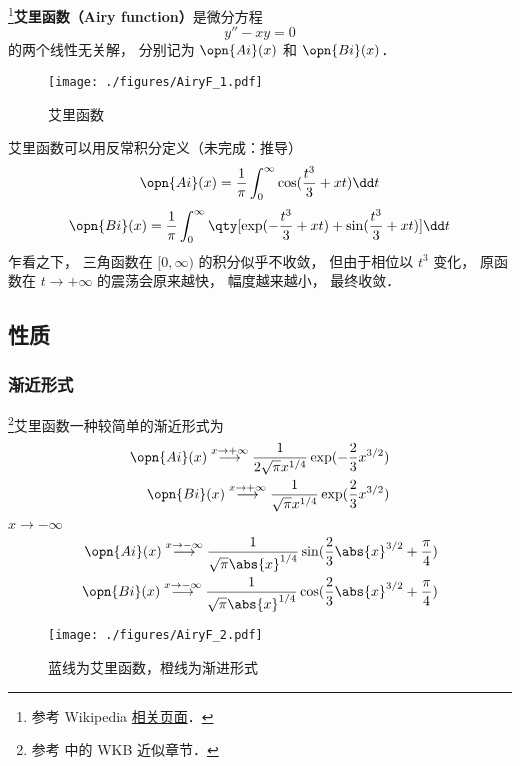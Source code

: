 
\begin{issues}
\issueTODO
\end{issues}


\footnote{参考 Wikipedia \href{https://en.wikipedia.org/wiki/Airy_function}{相关页面}．}\textbf{艾里函数（Airy function）}是微分方程
\begin{equation}
y'' - xy = 0
\end{equation}
的两个线性无关解， 分别记为 $\opn{Ai}(x)$ 和 $\opn{Bi}(x)$．

\begin{figure}[ht]
\centering
\texttt{[image: ./figures/AiryF\_1.pdf]}
\caption{艾里函数} \label{AiryF_fig1}
\end{figure}

艾里函数可以用反常积分定义（未完成：推导）
\begin{equation}
\opn{Ai}(x)=\frac 1\pi \int_0^\infty \cos(\frac{t^3}{3}+xt)\dd t
\end{equation}
\begin{equation}
\opn{Bi}(x)=\frac 1\pi \int_0^\infty \qty[\exp(-\frac{t^3}{3}+xt)+\sin(\frac{t^3}{3}+xt)]\dd t
\end{equation}
乍看之下， 三角函数在 $[0,\infty)$ 的积分似乎不收敛， 但由于相位以 $t^3$ 变化， 原函数在 $t\to+\infty$ 的震荡会原来越快， 幅度越来越小， 最终收敛．


\subsection{性质}
\subsubsection{渐近形式}
\footnote{参考 \cite{GriffQ} 中的 WKB 近似章节．}艾里函数一种较简单的渐近形式为
\begin{align}
\opn{Ai}(x) \overset{x \to +\infty}{\longrightarrow} \frac{1}{2\sqrt{\pi} x^{1/4}} \exp(-\frac{2}{3}x^{3/2})\\
\opn{Bi}(x) \overset{x \to +\infty}{\longrightarrow} \frac{1}{\sqrt{\pi} x^{1/4}} \exp(\frac{2}{3}x^{3/2})
\end{align}
$x \to -\infty$
\begin{align}
\opn{Ai}(x) \overset{x \to -\infty}{\longrightarrow} \frac{1}{\sqrt{\pi} \abs{x}^{1/4}} \sin(\frac{2}{3}\abs{x}^{3/2}+\frac{\pi}{4})\\
\opn{Bi}(x) \overset{x \to -\infty}{\longrightarrow} \frac{1}{\sqrt{\pi} \abs{x}^{1/4}} \cos(\frac{2}{3}\abs{x}^{3/2}+\frac{\pi}{4})
\end{align}
\begin{figure}[ht]
\centering
\texttt{[image: ./figures/AiryF\_2.pdf]}
\caption{蓝线为艾里函数，橙线为渐进形式} \label{AiryF_fig2}
\end{figure}

